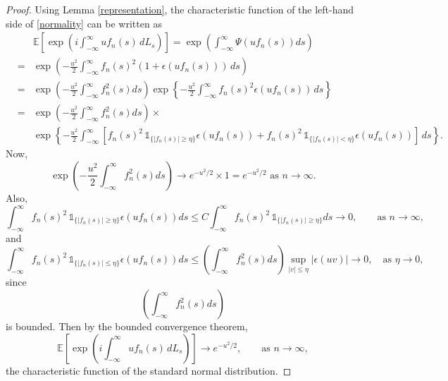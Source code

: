 \documentclass[preprint,12pt]{article}
\newcommand{\ind}[1]{\,\mathds{1}_{\{#1\}}}
\begin{document}
\begin{proof}
    
Using Lemma \ref{representation},  the characteristic function of the left-hand side of \eqref{normality} can be written as
\begin{eqnarray}\label{conditional expectation}
&&\mathbb{E}\left[\exp\left(i\int_{-\infty}^\infty uf_n(s)\,dL_s\right)\right]
=\exp\left(\int_{-\infty}^\infty \Psi(uf_n(s))ds\right)\nonumber\\
&=&\exp\left(
-\frac{u^2}{2}
\int_{-\infty}^{\infty}
f_n(s)^2
\left(1+\epsilon(uf_n(s))\right)\,ds
\right)\nonumber\\
&=&
\exp\left(-\frac{u^2}{2}\int_{-\infty}^\infty f^2_n(s)ds\right)
\exp
\left\{
-\frac{u^2}{2}
\int_{-\infty}^{\infty}
f_n(s)^2\epsilon(uf_n(s))\,ds
\right\}
\nonumber\\
&=&\exp\left(-\frac{u^2}{2}\int_{-\infty}^\infty f^2_n(s)ds\right)\times\nonumber\\
&&
\exp
\left\{
-\frac{u^2}{2}
\int_{-\infty}^{\infty}
\left[f_n(s)^2\ind{\vert f_n(s)\vert\ge\eta}\epsilon(uf_n(s))+
f_n(s)^2\ind{\vert f_n(s)\vert<\eta}\epsilon(uf_n(s))\right]\,ds
\right\}\nonumber.
\end{eqnarray}
Now,
$$
\exp\left(-\frac{u^2}{2}\int_{-\infty}^\infty f^2_n(s)ds\right)\to e^{-u^2/2}\times1=e^{-u^2/2}\textrm{ as }n\to\infty.
$$
Also,
$$
\int_{-\infty}^{\infty}
f_n(s)^2\ind{\vert f_n(s)\vert\ge\eta}\epsilon(uf_n(s))ds\le C
\int_{-\infty}^{\infty}
f_n(s)^2\ind{\vert f_n(s)\vert\ge\eta}ds\to0,\qquad\textrm{as }n\to\infty,
$$
and
$$
\int_{-\infty}^{\infty}
f_n(s)^2\ind{\vert f_n(s)\vert\le\eta}\epsilon(uf_n(s))ds\le \left(\int_{-\infty}^\infty f^2_n(s)ds\right)
\underset{\vert v\vert\le\eta}{\sup}\vert\epsilon(uv)\vert\to0,\quad\textrm{as }\eta\to0,
$$
since 
$$
 \left(\int_{-\infty}^\infty f^2_n(s)ds\right)
$$
is bounded.
Then by the bounded convergence theorem, 
$$
\mathbb{E}\left[\exp\left(i\int_{-\infty}^\infty uf_n(s)\,dL_s\right)\right]\to e^{-u^2/2},\qquad\textrm{as }n\to\infty,
$$
the characteristic function of the standard normal distribution.

\end{proof}
\end{document}
